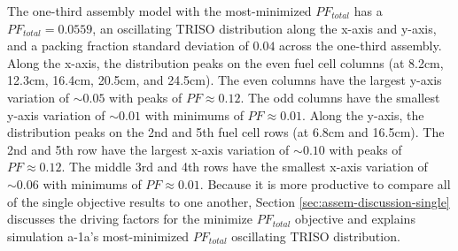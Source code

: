 The one-third assembly model with the most-minimized $PF_{total}$ has a 
$PF_{total} =0.0559$, an oscillating TRISO distribution along the 
x-axis and y-axis, and a packing fraction standard deviation of $0.04$ across the 
one-third assembly. 
Along the x-axis, the distribution peaks on the even fuel cell columns (at 8.2cm, 12.3cm, 
16.4cm, 20.5cm, and 24.5cm). 
The even columns have the largest y-axis variation of ${\sim}0.05$ with peaks of
$PF\approx0.12$.
The odd columns have the smallest y-axis variation of ${\sim}0.01$ with minimums of 
$PF\approx0.01$.
Along the y-axis, the distribution peaks on the 2nd and 5th fuel cell rows (at 6.8cm and 
16.5cm).
The 2nd and 5th row have the largest x-axis variation of ${\sim}0.10$ with peaks of 
$PF\approx0.12$. 
The middle 3rd and 4th rows have the smallest x-axis variation of ${\sim}0.06$ with 
minimums of $PF\approx0.01$.
Because it is more productive to compare all of the single objective results to one 
another, Section \ref{sec:assem-discussion-single} discusses the driving factors for
the minimize $PF_{total}$ objective and explains simulation a-1a's most-minimized 
$PF_{total}$ oscillating TRISO distribution. 

